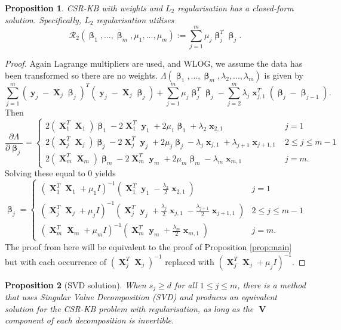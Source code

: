 \documentclass[12pt]{article}
\DeclareMathOperator{\bx}{\textbf{x}}
\DeclareMathOperator{\bX}{\textbf{X}}
\DeclareMathOperator{\by}{\textbf{y}}
\DeclareMathOperator{\bV}{\textbf{V}}
\DeclareMathOperator{\bbeta}{\boldsymbol{\beta}}
\newtheorem{prop}{Proposition}
\begin{document}
\begin{prop}
CSR-KB with weights and $L_2$ regularisation has a closed-form solution. Specifically, $L_2$ regularisation utilises 
$$\mathcal{R}_2(\bbeta_1, ..., \bbeta_m, \mu_1, ..., \mu_m) := \sum_{j=1}^m \mu_j \bbeta_j^T\bbeta_j.$$
\end{prop}
\begin{proof}
Again Lagrange multipliers are used, and WLOG, we assume the data has been transformed so there are no weights. $\Lambda(\bbeta_1,...,\bbeta_m,\lambda_2,...,\lambda_m)$ is given by
$$\sum_{j=1}^m (\by_j-\bX_j\bbeta_j)^T(\by_j-\bX_j\bbeta_j)+\sum_{j=1}^m \mu_j \bbeta_j^T\bbeta_j-\sum_{j=2}^m\lambda_j\bx_{j, 1}^T (\bbeta_j - \bbeta_{j-1}).$$
Then
$$\frac{\partial \Lambda}{\partial \bbeta_j} = \begin{cases}
2(\bX_1^T  \bX_1)\bbeta_1 - 2\bX_1^T \by_1 + 2\mu_1\bbeta_1 +\lambda_{2}\bx_{2, 1} & j=1 \\
2(\bX_j^T  \bX_j)\bbeta_j - 2\bX_j^T  \by_j + 2\mu_j\bbeta_j - \lambda_j\bx_{j, 1}+\lambda_{j+1}\bx_{j+1, 1} & 2 \leq j \leq m-1 \\
2(\bX_m^T \bX_m)\bbeta_m - 2\bX_m^T \by_m + 2\mu_m\bbeta_m  - \lambda_m\bx_{m, 1} & j=m.
\end{cases}$$
Solving these equal to $0$ yields
$$\bbeta_j=\begin{cases}
\left(\bX_1^T  \bX_1+\mu_1I\right)^{-1}(\bX_1^T \by_1 -\frac{\lambda_{2}}{2}\bx_{2, 1}) & j=1 \\
\left(\bX_j^T  \bX_j+\mu_jI \right)^{-1}(\bX_j^T \by_j + \frac{\lambda_j}{2}\bx_{j, 1}-\frac{\lambda_{j+1}}{2}\bx_{j+1, 1}) & 2 \leq j \leq m-1 \\
\left(\bX_m^T \bX_m+\mu_mI\right)^{-1}(\bX_m^T \by_m + \frac{\lambda_m}{2}\bx_{m, 1}) & j=m.
\end{cases}$$
The proof from here will be equivalent to the proof of Proposition \ref{prop:main} but with each occurrence of $\left(\bX_j^T  \bX_j \right)^{-1}$ replaced with $\left(\bX_j^T \bX_j+\mu_jI \right)^{-1}$.
\end{proof}
\begin{prop}[SVD solution]
When $s_j \geq d$ for all $1 \leq j \leq m$, there is a method that uses Singular Value Decomposition (SVD) and produces an equivalent solution for the CSR-KB problem with regularisation, as long as the $\bV$ component of each decomposition is invertible.
\end{prop}
\end{document}
